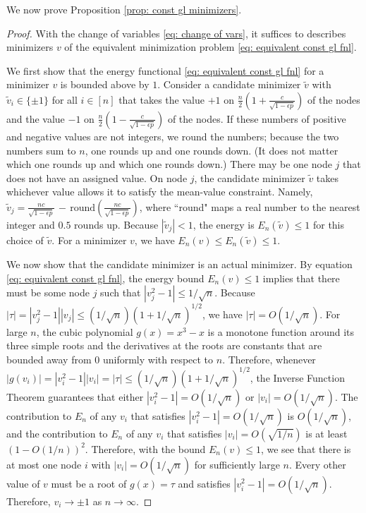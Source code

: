 \documentclass[11pt]{amsart}
\def\ep{\epsilon}
\numberwithin{equation}{section}
\begin{document}
{We now prove Proposition \ref{prop: const gl minimizers}.

\begin{proof}

With the change of variables \eqref{eq: change of vars}, it suffices to describes minimizers $v$ of the equivalent minimization problem \eqref{eq: equivalent const gl fnl}. 

{We first show} that the energy functional \eqref{eq: equivalent const gl fnl} for a minimizer $v$ is bounded above by $1$. 
Consider a candidate minimizer $\tilde{v}$ with $\tilde{v}_i\in \{\pm 1\}$ for all {$i \in [n]$} that takes the value $+1$ on $\frac{n}{2}(1 + \frac{c}{\sqrt{1 - \ep p}})$ of the nodes and the value $-1$ on $\frac{n}{2}(1 - \frac{c}{\sqrt{1 - \ep p}})$ of the nodes. If these numbers of positive and negative values are not integers, we round the numbers; because the two numbers sum to $n$, one rounds up and one rounds down. (It does not matter which one rounds up and which one rounds down.)
There may be one node $j$ that does not have an assigned value. On node $j$, the candidate minimizer $\tilde{v}$ takes whichever value allows it to satisfy the {mean-value constraint}. Namely, $\tilde{v}_j = \frac{nc}{\sqrt{1 - \ep p}} \, - \, \text{round}(\frac{nc}{\sqrt{1 - \ep p}})$, where ``round" maps a real number to the nearest integer and $0.5$ rounds up. Because $|\tilde{v}_j| < 1$, the energy is $E_n(\tilde{v})\leq 1$ for this choice of $\tilde{v}$. For a minimizer $v$, we have $E_n(v) \leq E_n(\tilde{v}) \leq 1$. 

We now show that the candidate minimizer is an actual minimizer. By equation \eqref{eq: equivalent const gl fnl}, the energy bound $E_n(v) \leq 1$ implies that there must be some {node} $j$ such that  $|v_j^2 - 1|\leq 1/\sqrt{n}$. Because $|\tau| = |v_j^2 - 1| |v_j|\leq (1/\sqrt{n})(1 +  1/\sqrt{n})^{1/2}$, 
we have {$|\tau| = O(1/\sqrt{n})$}.
For large $n$, the cubic polynomial
$g(x) = x^3 - x$ is a monotone function 
around its three simple roots and the derivatives at the roots are constants that are bounded away from $0$ uniformly with respect to $n$. Therefore, whenever $|g(v_i)| = |v_i^2 - 1| |v_i| = |\tau| \leq (1/\sqrt{n})(1 +  1/\sqrt{n})^{1/2}$, {the Inverse Function Theorem guarantees} that either $|v_i^2 - 1| = O(1/\sqrt{n})$ or $|v_i| = O(1/\sqrt{n})$.
{The contribution to $E_n$ of any $v_i$ that satisfies $|v_i^2 - 1| = O(1/\sqrt{n})$ is $O(1/\sqrt{n})$, {and} the contribution to $E_n$ of any $v_i$ that satisfies $|v_i| = O(\sqrt{1/n})$ is at least $(1 - {O(1/n)} )^2$.} Therefore, with the bound $E_n(v) \leq 1$, we see that there is at most one node $i$ with $|v_i| = O(1/\sqrt{n})$ {for} sufficiently large $n$.
Every other value of $v$ {must} be a root 
of $g(x) = \tau$ and
satisfies $|v_i^2 - 1| = O(1/\sqrt{n})$. {Therefore,} $v_i\to \pm 1$ as $n\to \infty$.


\end{proof}}
\end{document}
